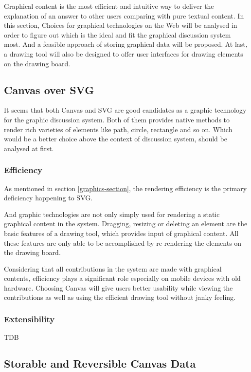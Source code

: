 
Graphical content is the most efficient and intuitive way to deliver the explanation of an answer to other users comparing with pure textual content. In this section, Choices for graphical technologies on the Web will be analysed in order to figure out which is the ideal and fit the graphical discussion system most. And a feasible approach of storing graphical data will be proposed. At last, a drawing tool will also be designed to offer user interfaces for drawing elements on the drawing board.

\subsection{Canvas over SVG}
It seems that both Canvas and SVG are good candidates as a graphic technology for the graphic discussion system. Both of them provides native methods to render rich varieties of elements like path, circle, rectangle and so on. Which would be a better choice above the context of discussion system, should be analysed at first.

\subsubsection{Efficiency}
As mentioned in section \ref{graphics-section}, the rendering efficiency is the primary deficiency happening to SVG. 

And graphic technologies are not only simply used for rendering a static graphical content in the system. Dragging, resizing or deleting an element are the basic features of a drawing tool, which provides input of graphical content. All these features are only able to be accomplished by re-rendering the elements on the drawing board. 

Considering that all contributions in the system are made with graphical contents, efficiency plays a significant role especially on mobile devices with old hardware. Choosing Canvas will give users better usability while viewing the contributions as well as using the efficient drawing tool without janky feeling. 

\subsubsection{Extensibility}
TDB

\subsection{Storable and Reversible Canvas Data }\label{subsec:storable-canvas-data}

